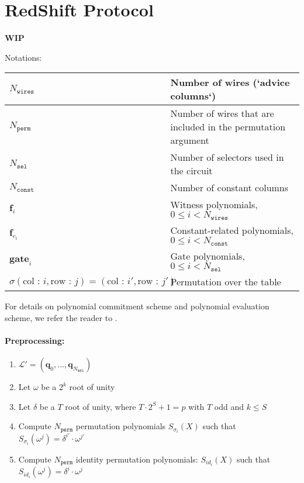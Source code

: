 \section{RedShift Protocol}
\label{section:protocol}
\textbf{WIP}

Notations:

\begin{center}
\begin{table}[H]
\begin{tabular}{| l | l |}
 	\hline
	$N_{\texttt{wires}}$ & Number of wires (`advice columns`) \\
	\hline
	$N_{\texttt{perm}}$ & Number of wires that are included in the permutation argument \\
	\hline
	$N_{\texttt{sel}}$ & Number of selectors used in the circuit \\
	\hline
	$N_{\texttt{const}}$ & Number of constant columns  \\
	\hline
	$\textbf{f}_i$ & Witness polynomials, $0 \leq i < N_{\texttt{wires}}$  \\
	\hline
	$\textbf{f}_{c_i}$ & Constant-related polynomials, $0 \leq i < N_{\texttt{const}}$  \\
	\hline
	$\textbf{gate}_i$ & Gate polynomials, $0 \leq i < N_{\texttt{sel}}$  \\
	\hline
	$\sigma(\text{col : } i, \text{row : } j) = (\text{col : } i', \text{row : } j')$ & Permutation over the table \\
	\hline
\end{tabular}
\end{table}
\end{center}

For details on polynomial commitment scheme and polynomial evaluation scheme, we refer the reader to \cite{cryptoeprint:2019:1400}.

\paragraph{Preprocessing:}


\begin{algorithm}[h]
\begin{enumerate}
	\item $\mathcal{L}' = (\textbf{q}_{0}, ..., \textbf{q}_{N_{\texttt{sel}}})$
	\item Let $\omega$ be a $2^k$ root of unity
	\item Let $\delta$ be a $T$ root of unity, where $T \cdot 2^S + 1 = p$ with $T$ odd and $k \leq S$
	\item Compute $N_{\texttt{perm}}$ permutation polynomials $S_{\sigma_i}(X)$ such that $S_{\sigma_i}(\omega^j) = \delta^{i'} \cdot \omega^{j'}$
	\item Compute $N_{\texttt{perm}}$ identity permutation polynomials: $S_{id_i}(X)$ such that $S_{id_i}(\omega^j) = \delta^i \cdot \omega^j$
\end{enumerate}
\end{algorithm}

